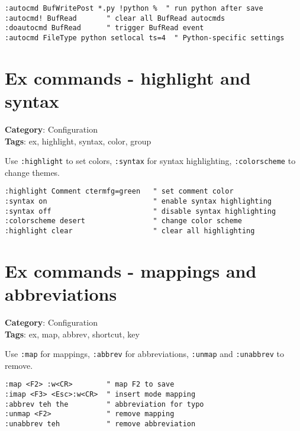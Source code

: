 {{{{\begin{Exa*}{}
\begin{Verbatim}[fontsize=\footnotesize, breaklines, breakanywhere]
:autocmd BufWritePost *.py !python %  " run python after save
:autocmd! BufRead       " clear all BufRead autocmds
:doautocmd BufRead      " trigger BufRead event
:autocmd FileType python setlocal ts=4  " Python-specific settings
\end{Verbatim}
\end{Exa*}

\section{Ex commands - highlight and syntax}

\textbf{Category}: Configuration\\ \textbf{Tags}: ex, highlight, syntax, color, group
\vspace{0.5cm}

Use {\footnotesize \Verb§:highlight§} to set colors, {\footnotesize \Verb§:syntax§} for syntax highlighting, {\footnotesize \Verb§:colorscheme§} to change themes.

\begin{Exa*}{}
\begin{Verbatim}[fontsize=\footnotesize, breaklines, breakanywhere]
:highlight Comment ctermfg=green   " set comment color
:syntax on                         " enable syntax highlighting
:syntax off                        " disable syntax highlighting
:colorscheme desert                " change color scheme
:highlight clear                   " clear all highlighting
\end{Verbatim}
\end{Exa*}

\section{Ex commands - mappings and abbreviations}

\textbf{Category}: Configuration\\ \textbf{Tags}: ex, map, abbrev, shortcut, key
\vspace{0.5cm}

Use {\footnotesize \Verb§:map§} for mappings, {\footnotesize \Verb§:abbrev§} for abbreviations, {\footnotesize \Verb§:unmap§} and {\footnotesize \Verb§:unabbrev§} to remove.

\begin{Exa*}{}
\begin{Verbatim}[fontsize=\footnotesize, breaklines, breakanywhere]
:map <F2> :w<CR>        " map F2 to save
:imap <F3> <Esc>:w<CR>  " insert mode mapping
:abbrev teh the         " abbreviation for typo
:unmap <F2>             " remove mapping
:unabbrev teh           " remove abbreviation
\end{Verbatim}
\end{Exa*}

}}}}
